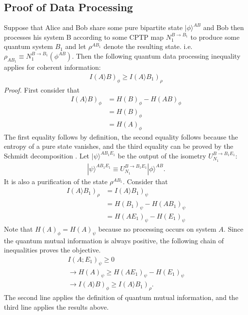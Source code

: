 \subsection{Proof of Data Processing}\label{sec:pfDataProcess}
Suppose that Alice and Bob share some pure bipartite state $|\phi \rangle ^{AB}$ and 
Bob then processes his system B according to some CPTP map $N_1^{B\to B_1}$ to produce some quantum system $B_1$ and let $\rho ^{AB_1}$ denote the resulting state. i.e.
$\rho_{AB_1} \equiv N_1^{B\to B_1}(\phi ^{AB})$. Then the following quantum data processing inequality applies for coherent information:
\begin{align*}
I(A\rangle B)_{\phi} \geq I(A\rangle B_1)_{\rho}
\end{align*}
\textit{Proof.} First consider that
\begin{align*}
I(A\rangle B)_{\phi} &= H(B)_\phi -H(AB)_\phi \\
&=H(B)_\phi \\
&=H(A)_\phi
\end{align*}
The first equality follows by definition, the second equality follows because the entropy of a pure state vanishes, and the third equality can be proved by the Schmidt decomposition \cite{CtoQ}. Let $|\psi \rangle ^{AB_1E_1}$ be the output of the isometry $U_{N_1}^{B \to B_1E_1}$:
\begin{align*}
|\psi \rangle ^{AB_1E_1} \equiv U_{N_1}^{B \to B_1E_1}|\phi \rangle ^{AB}.
\end{align*}
It is also a purification of the state $\rho ^{AB_1}$. Consider that
\begin{align*}
I(A \rangle B_1)_\rho &= I(A \rangle B_1)_\psi \\
&=H(B_1)_\psi - H(AB_1)_\psi \\
&=H(AE_1)_\psi - H(E_1)_\psi
\end{align*}
Note that $H(A)_\phi = H(A)_\psi$ because no processing occurs on system $A$. Since the quantum mutual information is always positive, the following chain of inequalities proves the objective.
\begin{align*}
I(A;E_1)_\psi \geq 0 \\
\rightarrow H(A)_\psi \geq H(AE_1)_\psi - H(E_1)_\psi \\
\rightarrow I(A\rangle B)_\phi \geq I(A\rangle B_1)_\rho .
\end{align*}
The second line applies the definition of quantum mutual information, and the third line applies the results above.